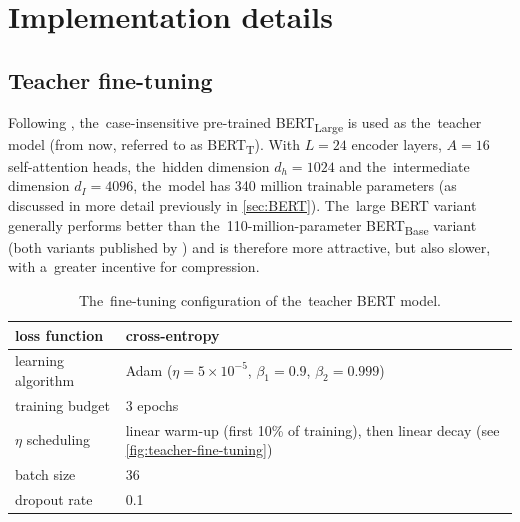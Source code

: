 \documentclass[bsc,frontabs,singlespacing,parskip,deptreport]{infthesis}
\def\BERTT{BERT\textsubscript{T}}
\begin{document}
{  \section{Implementation details}{
    \label{sec:implementation-details}
    \subsection{Teacher fine-tuning}{
      Following \citet{Tang_2019b}, the~case-insensitive pre-trained BERT\textsubscript{Large} is used as the~teacher model (from now, referred to as \BERTT).
      With $L=24$ encoder layers, $A=16$ self-attention heads, the~hidden dimension $d_h=1024$ and the~intermediate dimension $d_I=4096$, the~model has 340 million trainable parameters (as discussed in more detail previously in \autoref{sec:BERT}).
      The~large BERT variant generally performs better than the~110-million-parameter BERT\textsubscript{Base} variant (both variants published by \citet{Devlin_2018}) and is therefore more attractive, but also slower, with a~greater incentive for compression.

      \begin{table}[h!t]
      \centering
      \footnotesize
      \begin{tabular}{m{}m{}}
      \toprule
      loss function & cross-entropy \\
      \hline
      learning algorithm & Adam ($\eta=5\times10^{-5}$, $\beta_1=0.9$, $\beta_2=0.999$) \\
      \hline
      training budget & 3 epochs \\
      \hline
      $\eta$ scheduling & linear warm-up (first 10\% of training), then linear decay (see \autoref{fig:teacher-fine-tuning}) \\
      \hline
      batch size & 36 \\
      \hline
      dropout rate & 0.1 \\
      \bottomrule
      \end{tabular}
      \caption{The~fine-tuning configuration of the~teacher BERT model.}
      \label{tab:initial-config-teacher}
      \end{table}

}}}
\end{document}
